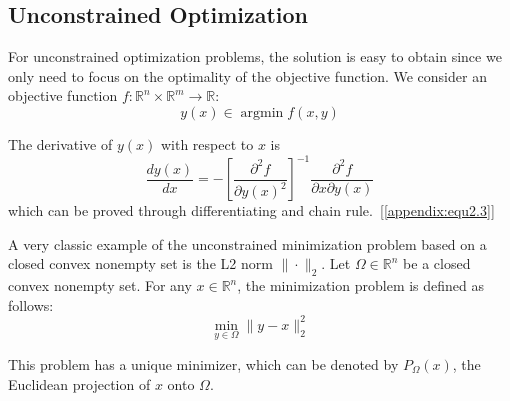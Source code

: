\subsection{Unconstrained Optimization}
For unconstrained optimization problems, the solution is easy to obtain since we only need to focus on the optimality of the objective function. We consider an objective function $f: \mathbb{R}^{n} \times \mathbb{R}^m \rightarrow \mathbb{R}$:
$$
y(x) \in \operatorname{argmin}f(x, y)
$$ 
\par The derivative of $y(x)$ with respect to $x$ is
\begin{equation}
\label{equ:2.3}
\frac{dy(x)}{dx} = -[\frac{\partial^{2} f}{\partial y(x)^{2}}]^{-1}\frac{\partial^{2} f}{\partial x \partial y(x)}
\end{equation}
which can be proved through differentiating and chain rule.~[\ref{appendix:equ2.3}]
\par A very classic example of the unconstrained minimization problem based on a closed convex nonempty set is the L2 norm $\|\cdot\|_2$. Let $\Omega \in \mathbb{R}^n$ be a closed convex nonempty set. For any $x \in \mathbb{R}^{n}$, the minimization problem is defined as follows:
$$
\min _{y \in \Omega}\|y-x\|_2^{2}
$$
\par This problem has a unique minimizer, which can be denoted by $P_\Omega(x)$, the Euclidean projection of $x$ onto $\Omega$. 
